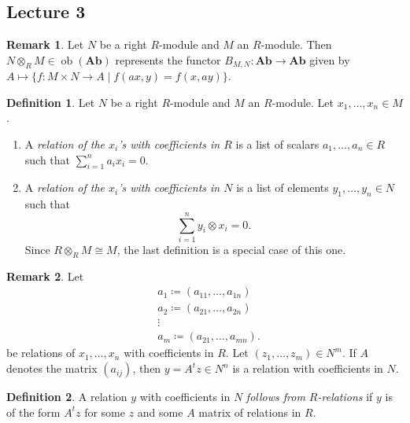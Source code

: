 \documentclass[10pt,letterpaper,cm]{nupset}
\theoremstyle{definition}
\newtheorem*{definition}{Definition}
\newtheorem{remark}{Remark}
\newcommand{\1}{\mathbf{1}}
\newcommand{\0}{\vec 0}
\DeclareMathOperator{\ob}{ob}
\begin{document}
\subsection{Lecture 3}

\begin{remark}
Let $N$ be a right $R$-module and $M$ an $R$-module. Then $N \otimes_R M \in \ob(\mathbf{Ab})$ represents the functor $B_{M, N}: \mathbf{Ab} \to \mathbf{Ab}$ given by $A \mapsto \{f:  M \times N \to A \mid f(ax, y) = f(x, ay) \}$. 
\end{remark}

\begin{definition} Let $N$ be a right $R$-module and $M$ an $R$-module. Let $x_1, \ldots, x_n \in M$.
\begin{enumerate}
\item A \textit{relation of the $x_i$'s with coefficients in $R$} is a list of scalars $a_1, \ldots, a_n \in R$ such that $\sum_{i=1}^n a_ix_i =0$.
\item A \textit{relation of the $x_i$'s with coefficients in $N$} is a list of elements $y_1, \ldots, y_n \in N$ such that $$\sum_{i=1}^n y_i \otimes x_i =0.$$ Since $R \otimes_R M \cong M$, the last definition is a special case of this one.
\end{enumerate}
\end{definition}

\begin{remark}
Let
\begin{align*}
& a_1 \coloneqq  (a_{11}, \ldots, a_{1n})
\\ & a_2 \coloneqq  (a_{21}, \ldots, a_{2n})
\\ & \vdots
\\ & a_m \coloneqq  (a_{21}, \ldots, a_{mn}).
\end{align*} be relations of $x_1, \ldots, x_n$ with coefficients in $R$.
Let $(z_1, \ldots, z_m)\in N^m$. If $A$ denotes the matrix $(a_{ij})$, then $y= A^tz \in N^n$ is a relation with coefficients in $N$.
\end{remark}

\begin{definition}
A relation $y$ with coefficients in $N$ \textit{follows from $R$-relations} if $y$ is of the form $A^tz$ for some $z$ and some $A$ matrix of relations in $R$.
\end{definition}
\end{document}
